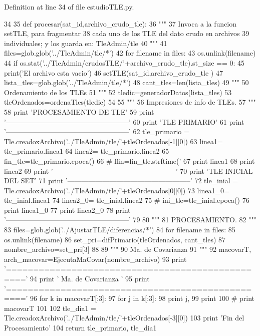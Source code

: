 \-Definition at line 34 of file estudio\-T\-L\-E.\-py.


\begin{DoxyCode}
34 
35 def procesar(sat_id,archivo_crudo_tle):
36     """
37     Invoca a la funcion setTLE, para fragmentar
38     cada uno de los TLE del dato crudo en archivos
39     individuales; y los guarda en: TleAdmin/tle
40     """
41     files=glob.glob('../TleAdmin/tle/*')
42     for filename in files:
43         os.unlink(filename)
44     if os.stat('../TleAdmin/crudosTLE/'+archivo_crudo_tle).st_size == 0:
45         print('El archivo esta vacio')
46     setTLE(sat_id,archivo_crudo_tle )
47     lista_tles=glob.glob('../TleAdmin/tle/*')
48     cant_tles=len(lista_tles)
49     """
50     Ordenamiento de los TLEs
51     """
52     tledic=generadorDatos(lista_tles)
53     tleOrdenados=ordenaTles(tledic)
54 
55     """
56     Impresiones de info de TLEs.
57     """
58     print 'PROCESAMIENTO DE TLE'
59     print '-----------------------------------------------------'
60     print 'TLE PRIMARIO'
61     print '-----------------------------------------------------'
62     tle_primario = Tle.creadoxArchivo('../TleAdmin/tle/'+tleOrdenados[-1][0])
63     linea1= tle_primario.linea1
64     linea2= tle_primario.linea2
65     fin_tle=tle_primario.epoca()
66 #    ffin=fin_tle.strftime('%
67     print linea1
68     print linea2
69     print '-----------------------------------------------------'
70     print 'TLE INICIAL DEL SET'
71     print '-----------------------------------------------------'
72     tle_inial = Tle.creadoxArchivo('../TleAdmin/tle/'+tleOrdenados[0][0])
73     linea1_0= tle_inial.linea1
74     linea2_0= tle_inial.linea2
75 #    ini_tle=tle_inial.epoca()
76     print linea1_0
77     print linea2_0
78     print '-----------------------------------------------------'
79     
80     """
81     PROCESAMIENTO.
82     """
83     files=glob.glob('../AjustarTLE/diferencias/*')
84     for filename in files:
85         os.unlink(filename)
86     set_pri=difPrimario(tleOrdenados, cant_tles)
87     nombre_archivo=set_pri[3]
88 
89     """
90     Ma. de Covarianza
91     """
92     macovarT, arch_macovar=EjecutaMaCovar(nombre_archivo)
93     print '================================================='
94     print '        Ma. de Covarianza                '
95     print '================================================='
96     for k in macovarT[:3]:
97         for j in k[:3]:
98             print j,
99         print
100 #    print macovarT
101     
102     tle_dia1 = Tle.creadoxArchivo('../TleAdmin/tle/'+tleOrdenados[-3][0])
103     print 'Fin del Procesamiento'
104     return tle_primario, tle_dia1

\end{DoxyCode}


